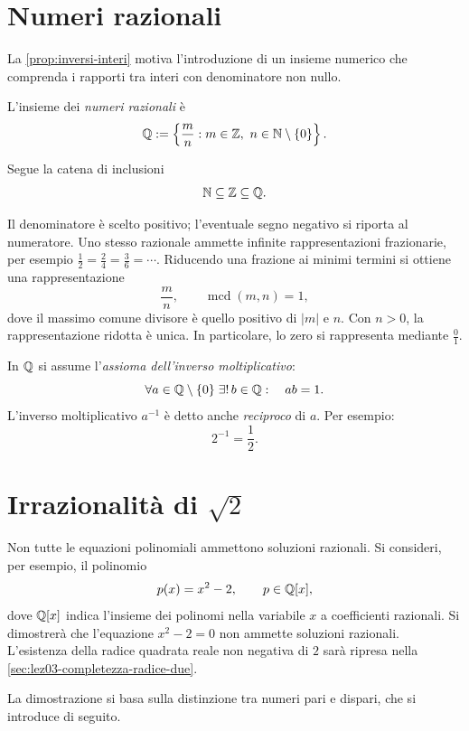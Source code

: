\clearpage

\section{Numeri razionali}
\label{sec:lez02-numeri-razionali}

La \cref{prop:inversi-interi} motiva l'introduzione di
un insieme numerico che comprenda i rapporti tra interi
con denominatore non nullo.

\begin{definition}
\label{def:numeri-razionali}
L'insieme dei \emph{numeri razionali} è
\[
  \Q:=\left\{\frac{m}{n}:m\in\Z,\ n\in\N\setminus\{0\}\right\}.
\]
\end{definition}

Segue la catena di inclusioni
\[
  \mathbb{N}\subseteq\mathbb{Z}\subseteq\mathbb{Q}.
\]

Il denominatore è scelto positivo; l'eventuale segno negativo
si riporta al numeratore. Uno stesso razionale ammette infinite
rappresentazioni frazionarie, per esempio
\(\frac12=\frac24=\frac36=\cdots\). Riducendo
una frazione ai minimi termini si ottiene una rappresentazione
\[
  \frac{m}{n},\qquad \operatorname{mcd}(m,n)=1,
\]
dove il massimo comune divisore è quello positivo di \(|m|\) e \(n\).
Con \(n>0\), la rappresentazione ridotta è unica. In particolare,
lo zero si rappresenta mediante \(\frac01\).

In \(\mathbb{Q}\) si assume l'\emph{assioma dell'inverso moltiplicativo}:
\[
  \forall a\in\mathbb{Q}\setminus\{0\}\;\exists!\,b\in\mathbb{Q}:
  \quad ab=1.
\]
L'inverso moltiplicativo \(a^{-1}\) è detto anche
\emph{reciproco} di \(a\). Per esempio:
\[
  2^{-1}=\frac12.
\]

\section[Irrazionalità della radice quadrata di 2]{Irrazionalità di \(\sqrt{2}\)}
\label{sec:lez02-irrazionalita-radice-due}

Non tutte le equazioni polinomiali ammettono soluzioni razionali.
Si consideri, per esempio, il polinomio
\[
  p(x)=x^2-2,
  \qquad p\in\mathbb{Q}[x],
\]
dove \(\mathbb{Q}[x]\) indica l'insieme dei polinomi nella variabile
\(x\) a coefficienti razionali. Si dimostrerà che l'equazione
\(x^2-2=0\) non ammette soluzioni razionali. L'esistenza della
radice quadrata reale non negativa di \(2\) sarà ripresa nella
\cref{sec:lez03-completezza-radice-due}.

La dimostrazione si basa sulla distinzione tra numeri pari e dispari,
che si introduce di seguito.

